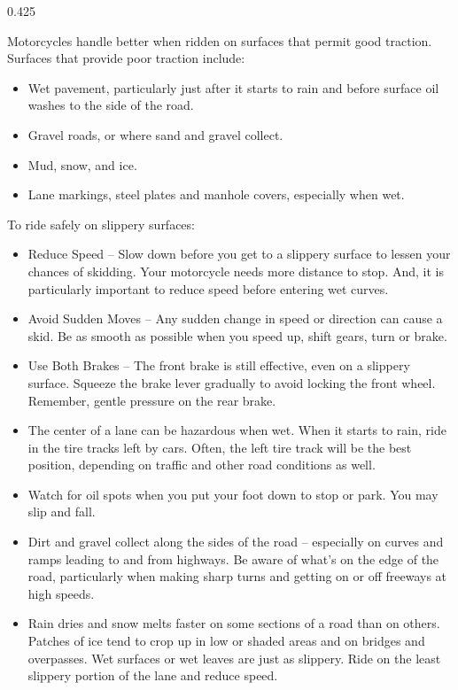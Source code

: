 

\begin{langblock}{0.425}
	\begin{eng}
	
	
	Motorcycles handle better when ridden on surfaces that permit good traction. Surfaces that provide poor traction include:
	
	\begin{itemize}[noitemsep]
		\item Wet pavement, particularly just after it starts to rain and before surface oil washes to the side of the road.
		\item Gravel roads, or where sand and gravel collect.
		\item Mud, snow, and ice.
		\item Lane markings, steel plates and manhole covers, especially when wet.
	\end{itemize}
	
	
	To ride safely on slippery surfaces:
	
	\begin{itemize}[noitemsep]
		\item Reduce Speed -- Slow down before you get to a slippery surface to lessen your chances of skidding. Your motorcycle needs more distance to stop. And, it is particularly important to reduce speed before entering wet curves.
		\item Avoid Sudden Moves -- Any sudden change in speed or direction can cause a skid. Be as smooth as possible when you speed up, shift gears, turn or brake.
		\item Use Both Brakes -- The front brake is still effective, even on a slippery surface. Squeeze the brake lever gradually to avoid locking the front wheel. Remember, gentle pressure on the rear brake.
		\item The center of a lane can be hazardous when wet. When it starts to rain, ride in the tire tracks left by cars. Often, the left tire track will be the best position, depending on traffic and other road conditions as well.
		\item Watch for oil spots when you put your foot down to stop or park. You may slip and fall.
		\item Dirt and gravel collect along the sides of the road -- especially on curves and ramps leading to and from highways. Be aware of what's on the edge of the road, particularly when making sharp turns and getting on or off freeways at high speeds.
		\item Rain dries and snow melts faster on some sections of a road than on others. Patches of ice tend to crop up in low or shaded areas and on bridges and overpasses. Wet surfaces or wet leaves are just as slippery. Ride on the least slippery portion of the lane and reduce speed.
	\end{itemize}
	

\end{eng}
\end{langblock}
